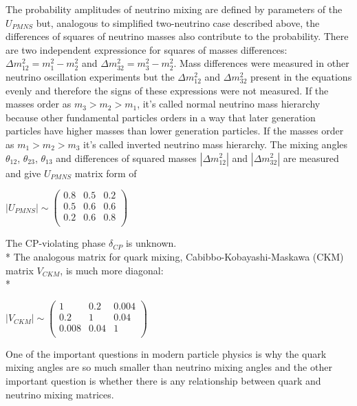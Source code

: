 The probability amplitudes of neutrino mixing are defined by parameters of the $U_{PMNS}$ but, analogous to simplified two-neutrino case described above, the differences of squares of neutrino masses also contribute to the probability. There are two independent expressionce for squares of masses differences: ${\Delta}m_{12}^2 = m_1^2-m_2^2$ and ${\Delta}m_{32}^2 = m_3^2-m_2^2$. Mass differences were measured in other neutrino oscillation experiments but the ${\Delta}m_{12}^2$ and ${\Delta}m_{32}^2$ present in the equations evenly and therefore the signs of these expressions were not measured. If the masses order as $m_3 > m_2 > m_1$, it's called normal neutrino mass hierarchy because other fundamental particles orders in a way that later generation particles have higher masses than lower generation particles. If the masses order as $m_1 > m_2 > m_3$ it's called inverted neutrino mass hierarchy. The mixing angles $\theta_{12}$, $\theta_{23}$, $\theta_{13}$ and differences of squared masses $|{\Delta}m_{12}^2|$ and $|{\Delta}m_{32}^2|$ are measured and give $U_{PMNS}$ matrix form of\\
\begin{center}
$|U_{PMNS}| \sim
 \begin{pmatrix}
  0.8 & 0.5 & 0.2 \\ 0.5 & 0.6 & 0.6 \\ 0.2 & 0.6 & 0.8 \\
 \end{pmatrix}$\\
\end{center}
The CP-violating phase $\delta_{CP}$ is unknown.\\*
The analogous matrix for quark mixing, Cabibbo-Kobayashi-Maskawa (CKM) matrix $V_{CKM}$, is much more diagonal:\\*
\begin{center}
$|V_{CKM}| \sim
 \begin{pmatrix}
  1 & 0.2 & 0.004 \\ 0.2 & 1 & 0.04 \\ 0.008 & 0.04 & 1 \\
 \end{pmatrix}$\\
\end{center}
One of the important questions in modern particle physics is why the quark mixing angles are so much smaller than neutrino mixing angles and the other important question is whether there is any relationship between quark and neutrino mixing matrices.\\

